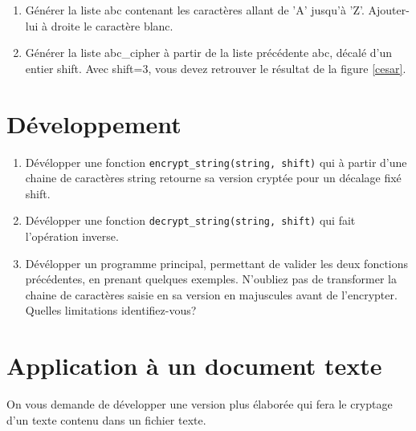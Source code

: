 \documentclass[a4paper, 12pt]{article}
\begin{document}
\begin{enumerate} 
\item Générer la liste abc contenant les caractères allant de 'A' jusqu'à 'Z'. Ajouter-lui à droite le caractère blanc. 

\item Générer la liste abc\_cipher à partir de la liste précédente abc, décalé d'un entier shift. Avec shift=3, vous devez retrouver le résultat de la figure
\ref{cesar}.

\end{enumerate} 

\section{Développement}

\begin{enumerate} 
\item Dévélopper une fonction {\tt encrypt\_string(string, shift)} qui à partir d'une chaine de caractères string
retourne sa version cryptée pour un décalage fixé shift.

\item Dévélopper une fonction {\tt  decrypt\_string(string, shift)} qui fait l'opération inverse.

\item Dévélopper un programme principal, permettant de valider les deux fonctions précédentes, en prenant quelques exemples.
N'oubliez pas de transformer la chaine de caractères saisie en sa version en majuscules avant de l'encrypter.
Quelles limitations identifiez-vous?

\end{enumerate} 

\section{Application à un document texte}

On vous demande de développer une version plus élaborée qui fera le cryptage d'un texte contenu dans un fichier texte.
\end{document}
